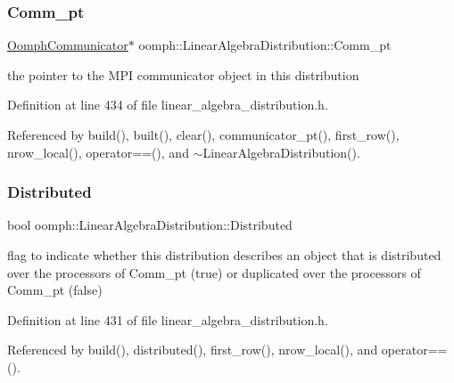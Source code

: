 \subsubsection{\texorpdfstring{Comm\+\_\+pt}{Comm\_pt}}
{\footnotesize\ttfamily \hyperlink{classoomph_1_1OomphCommunicator}{Oomph\+Communicator}$\ast$ oomph\+::\+Linear\+Algebra\+Distribution\+::\+Comm\+\_\+pt\hspace{0.3cm}{\ttfamily [private]}}



the pointer to the M\+PI communicator object in this distribution 



Definition at line 434 of file linear\+\_\+algebra\+\_\+distribution.\+h.



Referenced by build(), built(), clear(), communicator\+\_\+pt(), first\+\_\+row(), nrow\+\_\+local(), operator==(), and $\sim$\+Linear\+Algebra\+Distribution().

\mbox{\label{classoomph_1_1LinearAlgebraDistribution_a94492939a554e3415a477a13d0eb11c0}} 
\subsubsection{\texorpdfstring{Distributed}{Distributed}}
{\footnotesize\ttfamily bool oomph\+::\+Linear\+Algebra\+Distribution\+::\+Distributed\hspace{0.3cm}{\ttfamily [private]}}

flag to indicate whether this distribution describes an object that is distributed over the processors of Comm\+\_\+pt (true) or duplicated over the processors of Comm\+\_\+pt (false) 

Definition at line 431 of file linear\+\_\+algebra\+\_\+distribution.\+h.



Referenced by build(), distributed(), first\+\_\+row(), nrow\+\_\+local(), and operator==().

\mbox{\label{classoomph_1_1LinearAlgebraDistribution_a6dfae7ca9376aee99ca97d490a79dd9b}} 
